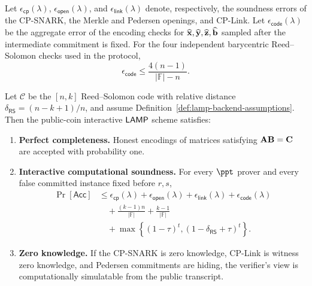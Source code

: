 \begin{revblock}
\begin{definition}
\label{def:lamp-backend-assumptions}
Let \(\epsilon_{\mathsf{cp}}(\lambda)\),
\(\epsilon_{\mathsf{open}}(\lambda)\), and
\(\epsilon_{\mathsf{link}}(\lambda)\) denote, respectively, the soundness
errors of the CP-SNARK, the Merkle and Pedersen openings, and CP-Link.  Let
\(\epsilon_{\mathsf{code}}(\lambda)\) be the aggregate error of the encoding
checks for
\(\widehat{\mathbf x},\widehat{\mathbf y},\widehat{\mathbf z},\widehat{\mathbf b}\)
sampled after the intermediate commitment is fixed.  For the four independent
barycentric Reed--Solomon checks used in the protocol,
\[
  \epsilon_{\mathsf{code}}
  \le \frac{4(n-1)}{|\mathbb F|-n}.
\]
\end{definition}

\begin{theorem}
\label{thm:security}
Let \(\mathcal C\) be the \([n,k]\) Reed--Solomon code with relative distance
\(\delta_{\mathsf{RS}}=(n-k+1)/n\), and assume
Definition~\ref{def:lamp-backend-assumptions}.  Then the public-coin interactive
\(\textsf{LAMP}\) scheme satisfies:
\begin{enumerate}[label=(\roman*)]
  \item \textbf{Perfect completeness.}
  Honest encodings of matrices satisfying
  \(\mathbf A\mathbf B=\mathbf C\) are accepted with probability one.

  \item \textbf{Interactive computational soundness.}
  For every \(\ppt\) prover and every false committed instance fixed before
  \(r,s\),
  \[
  \begin{aligned}
  \Pr[\mathsf{Acc}]
  &\le
    \epsilon_{\mathsf{cp}}(\lambda)
   +\epsilon_{\mathsf{open}}(\lambda)
   +\epsilon_{\mathsf{link}}(\lambda)
   +\epsilon_{\mathsf{code}}(\lambda)\\
  &\quad
   +\frac{(k-1)n}{|\mathbb F|}
   +\frac{k-1}{|\mathbb F|}\\
  &\quad
   +\max\!\left\{
      (1-\tau)^t,
      (1-\delta_{\mathsf{RS}}+\tau)^t
    \right\}.
  \end{aligned}
  \]

  \item \textbf{Zero knowledge.}
  If the CP-SNARK is zero knowledge, CP-Link is witness zero knowledge, and
  Pedersen commitments are hiding, the verifier's view is computationally
  simulatable from the public transcript.
\end{enumerate}
\end{theorem}


\end{revblock}
